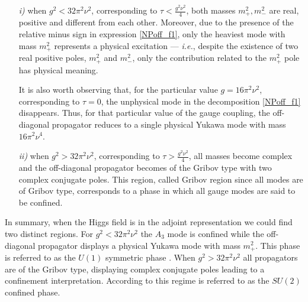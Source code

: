\begin{itemize}
\item[\it i)] 
when $g^2 < 32 \pi^2 \nu^2$, corresponding to $\tau < \frac{g^2\nu^2}{4}$, both masses $m^2_+, m^2_-$ are real, positive and  different from each other. Moreover, due to the presence of the relative minus sign in expression \eqref{NPoff_f1}, only the heaviest mode with mass $m^2_+$ represents a physical excitation --- {\it i.e.}, despite the existence of two real positive poles, $m^2_{+}$ and $m^{2}_{-}$, only the contribution related to the $m^{2}_{+}$ pole has physical meaning.

It is also worth observing that, for the particular value $g=16 \pi^2 \nu^2$, corresponding to $\tau=0$, the unphysical mode in the decomposition \eqref{NPoff_f1} disappears. Thus, for that particular value of the gauge coupling, the off-diagonal propagator reduces to a single physical Yukawa mode with mass $16\pi^2\nu^4$.
\item[\it ii)] when $g^2>32\pi^2\nu^2$, corresponding to $\tau> \frac{g^2\nu^2}{4}$, all masses become complex and the off-diagonal propagator becomes of the Gribov type with two complex conjugate poles. This region, called Gribov region since all modes are of Gribov type, corresponds to a phase in which all gauge modes are said to be confined.
\end{itemize}
In summary, when the Higgs field is in the adjoint representation we could find two distinct regions. For $g^2<32\pi^2\nu^2$ the $A_3$ mode is confined while the off-diagonal propagator displays a physical Yukawa mode with mass $m^2_+$. This phase is referred to as the $U(1)$ symmetric phase \cite{Nadkarni:1989na,Hart:1996ac}. When $g^2>32\pi^2\nu^2$ all propagators are of the Gribov type, displaying complex conjugate poles leading to a confinement interpretation. According to \cite{Nadkarni:1989na,Hart:1996ac} this regime is referred to as the $SU(2)$ confined phase. 

